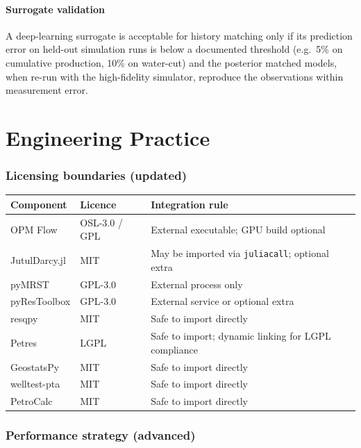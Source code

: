 \documentclass[10pt,a4paper]{article}
\begin{document}
\subsection{Surrogate validation}

A deep-learning surrogate is acceptable for history matching only if its
prediction error on held-out simulation runs is below a documented threshold
(e.g.\ 5\% on cumulative production, 10\% on water-cut) and the posterior
matched models, when re-run with the high-fidelity simulator, reproduce the
observations within measurement error.

\part{Engineering Practice}

\section{Licensing boundaries (updated)}

\begin{longtable}{@{}p{3.4cm}p{2.4cm}p{8.4cm}@{}}
\toprule
\textbf{Component} & \textbf{Licence} & \textbf{Integration rule}\\
\midrule
OPM Flow & OSL-3.0 / GPL & External executable; GPU build optional\\
JutulDarcy.jl & MIT & May be imported via \texttt{juliacall}; optional extra\\
pyMRST & GPL-3.0 & External process only\\
pyResToolbox & GPL-3.0 & External service or optional extra\\
resqpy & MIT & Safe to import directly\\
Petres & LGPL & Safe to import; dynamic linking for LGPL compliance\\
GeostatsPy & MIT & Safe to import directly\\
welltest-pta & MIT & Safe to import directly\\
PetroCalc & MIT & Safe to import directly\\
\bottomrule
\end{longtable}

\section{Performance strategy (advanced)}
\end{document}
